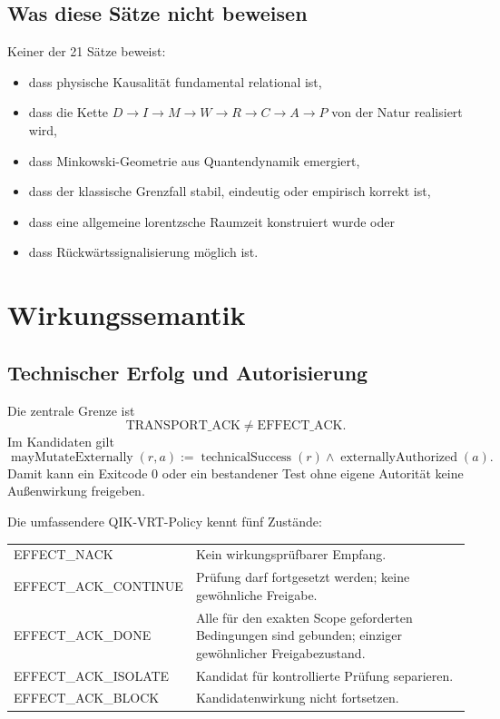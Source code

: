 \documentclass[11pt,a4paper]{article}
\begin{document}
\subsection{Was diese Sätze nicht beweisen}

Keiner der 21 Sätze beweist:

\begin{itemize}
  \item dass physische Kausalität fundamental relational ist,
  \item dass die Kette \(D\to I\to M\to W\to R\to C\to A\to P\) von der
  Natur realisiert wird,
  \item dass Minkowski-Geometrie aus Quantendynamik emergiert,
  \item dass der klassische Grenzfall stabil, eindeutig oder empirisch korrekt
  ist,
  \item dass eine allgemeine lorentzsche Raumzeit konstruiert wurde oder
  \item dass Rückwärtssignalisierung möglich ist.
\end{itemize}

\section{Wirkungssemantik}

\subsection{Technischer Erfolg und Autorisierung}

Die zentrale Grenze ist
\begin{equation}
  \boxed{\mathrm{TRANSPORT\_ACK}\neq\mathrm{EFFECT\_ACK}}.
\end{equation}
Im Kandidaten gilt
\begin{equation}
 \operatorname{mayMutateExternally}(r,a)
 :=\operatorname{technicalSuccess}(r)
 \land\operatorname{externallyAuthorized}(a).
\end{equation}
Damit kann ein Exitcode \(0\) oder ein bestandener Test ohne eigene Autorität
keine Außenwirkung freigeben.

Die umfassendere QIK-VRT-Policy kennt fünf Zustände:
\begin{center}
\begin{tabular}{>{\ttfamily}l p{}}
\toprule
EFFECT\_NACK & Kein wirkungsprüfbarer Empfang. \\
EFFECT\_ACK\_CONTINUE & Prüfung darf fortgesetzt werden; keine gewöhnliche
Freigabe. \\
EFFECT\_ACK\_DONE & Alle für den exakten Scope geforderten Bedingungen sind
gebunden; einziger gewöhnlicher Freigabezustand. \\
EFFECT\_ACK\_ISOLATE & Kandidat für kontrollierte Prüfung separieren. \\
EFFECT\_ACK\_BLOCK & Kandidatenwirkung nicht fortsetzen. \\
\bottomrule
\end{tabular}
\end{center}
\end{document}
